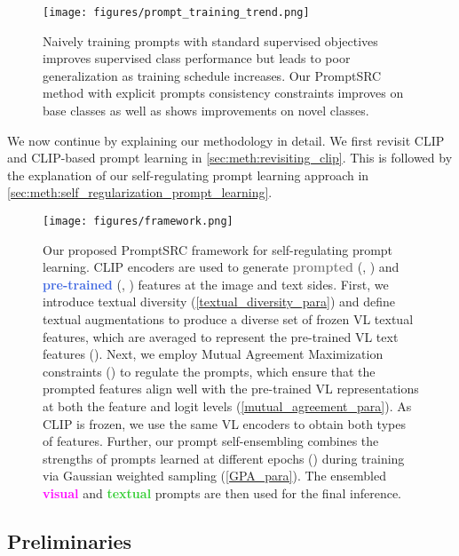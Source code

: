 \documentclass[10pt,twocolumn,letterpaper]{article}
\begin{document}
\begin{figure}[!t]
    \centering
    \texttt{[image: figures/prompt\_training\_trend.png]}\vspace{-0.5em}
\caption{Naively training prompts with standard supervised objectives improves supervised class performance but leads to poor generalization as training schedule increases. Our PromptSRC method with explicit prompts consistency constraints improves on base classes as well as shows improvements on novel classes.}
  \label{fig:prompt_ovefitting}\end{figure}


We now continue by explaining our methodology in detail. We first revisit CLIP and CLIP-based prompt learning in \autoref{sec:meth:revisiting_clip}. This is followed by the explanation of our self-regulating prompt learning approach in \autoref{sec:meth:self_regularization_prompt_learning}.

\begin{figure*}[!ht]
\centering
{\texttt{[image: figures/framework.png]}}\vspace{-0.5em}
\caption{Our proposed PromptSRC framework for self-regulating prompt learning. CLIP encoders are used to generate \textbf{\textcolor{gray}{prompted}} (, ) and \textbf{\textcolor{RoyalBlue}{pre-trained}} (, ) features at the image and text sides. First, we introduce textual diversity (\cref{textual_diversity_para}) and define textual augmentations to produce a diverse set of frozen VL textual features, which are averaged to represent the pre-trained VL text features (). Next, we employ Mutual Agreement Maximization constraints () to regulate the prompts, which ensure that the prompted features align well with the pre-trained VL representations at both the feature and logit levels (\cref{mutual_agreement_para}). As CLIP is frozen, we use the same VL encoders to obtain both types of features. Further, our prompt self-ensembling combines the strengths of prompts learned at different epochs () during training via Gaussian weighted sampling (\cref{GPA_para}). The ensembled \textbf{\textcolor{Magenta}{visual}} and \textbf{\textcolor{LimeGreen}{textual}} prompts are then used for the final inference.}
\label{fig:main_figure}
\end{figure*}

\subsection{Preliminaries}
\label{sec:meth:revisiting_clip}
\end{document}
